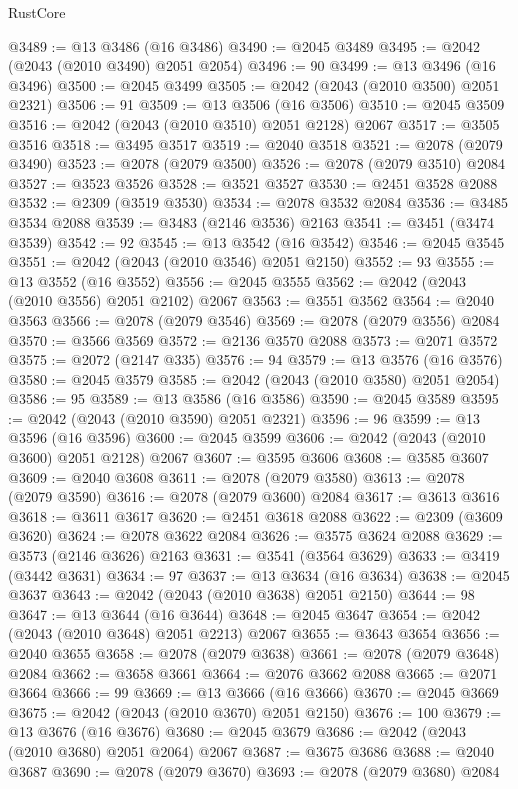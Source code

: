 \begin{lexlean}{RustCore}
\begin{coremodule}
@3489 := @13 @3486 (@16 @3486)
@3490 := @2045 @3489
@3495 := @2042 (@2043 (@2010 @3490) @2051 @2054)
@3496 := 90
@3499 := @13 @3496 (@16 @3496)
@3500 := @2045 @3499
@3505 := @2042 (@2043 (@2010 @3500) @2051 @2321)
@3506 := 91
@3509 := @13 @3506 (@16 @3506)
@3510 := @2045 @3509
@3516 := @2042 (@2043 (@2010 @3510) @2051 @2128) @2067
@3517 := @3505 @3516
@3518 := @3495 @3517
@3519 := @2040 @3518
@3521 := @2078 (@2079 @3490)
@3523 := @2078 (@2079 @3500)
@3526 := @2078 (@2079 @3510) @2084
@3527 := @3523 @3526
@3528 := @3521 @3527
@3530 := @2451 @3528 @2088
@3532 := @2309 (@3519 @3530)
@3534 := @2078 @3532 @2084
@3536 := @3485 @3534 @2088
@3539 := @3483 (@2146 @3536) @2163
@3541 := @3451 (@3474 @3539)
@3542 := 92
@3545 := @13 @3542 (@16 @3542)
@3546 := @2045 @3545
@3551 := @2042 (@2043 (@2010 @3546) @2051 @2150)
@3552 := 93
@3555 := @13 @3552 (@16 @3552)
@3556 := @2045 @3555
@3562 := @2042 (@2043 (@2010 @3556) @2051 @2102) @2067
@3563 := @3551 @3562
@3564 := @2040 @3563
@3566 := @2078 (@2079 @3546)
@3569 := @2078 (@2079 @3556) @2084
@3570 := @3566 @3569
@3572 := @2136 @3570 @2088
@3573 := @2071 @3572
@3575 := @2072 (@2147 @335)
@3576 := 94
@3579 := @13 @3576 (@16 @3576)
@3580 := @2045 @3579
@3585 := @2042 (@2043 (@2010 @3580) @2051 @2054)
@3586 := 95
@3589 := @13 @3586 (@16 @3586)
@3590 := @2045 @3589
@3595 := @2042 (@2043 (@2010 @3590) @2051 @2321)
@3596 := 96
@3599 := @13 @3596 (@16 @3596)
@3600 := @2045 @3599
@3606 := @2042 (@2043 (@2010 @3600) @2051 @2128) @2067
@3607 := @3595 @3606
@3608 := @3585 @3607
@3609 := @2040 @3608
@3611 := @2078 (@2079 @3580)
@3613 := @2078 (@2079 @3590)
@3616 := @2078 (@2079 @3600) @2084
@3617 := @3613 @3616
@3618 := @3611 @3617
@3620 := @2451 @3618 @2088
@3622 := @2309 (@3609 @3620)
@3624 := @2078 @3622 @2084
@3626 := @3575 @3624 @2088
@3629 := @3573 (@2146 @3626) @2163
@3631 := @3541 (@3564 @3629)
@3633 := @3419 (@3442 @3631)
@3634 := 97
@3637 := @13 @3634 (@16 @3634)
@3638 := @2045 @3637
@3643 := @2042 (@2043 (@2010 @3638) @2051 @2150)
@3644 := 98
@3647 := @13 @3644 (@16 @3644)
@3648 := @2045 @3647
@3654 := @2042 (@2043 (@2010 @3648) @2051 @2213) @2067
@3655 := @3643 @3654
@3656 := @2040 @3655
@3658 := @2078 (@2079 @3638)
@3661 := @2078 (@2079 @3648) @2084
@3662 := @3658 @3661
@3664 := @2076 @3662 @2088
@3665 := @2071 @3664
@3666 := 99
@3669 := @13 @3666 (@16 @3666)
@3670 := @2045 @3669
@3675 := @2042 (@2043 (@2010 @3670) @2051 @2150)
@3676 := 100
@3679 := @13 @3676 (@16 @3676)
@3680 := @2045 @3679
@3686 := @2042 (@2043 (@2010 @3680) @2051 @2064) @2067
@3687 := @3675 @3686
@3688 := @2040 @3687
@3690 := @2078 (@2079 @3670)
@3693 := @2078 (@2079 @3680) @2084

\end{coremodule}
\end{lexlean}
